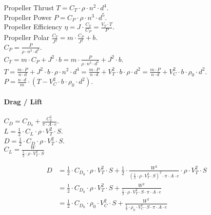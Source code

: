 \documentclass[a4paper,10pt,pdftex]{article}
\begin{document}
Propeller Thrust $T=C_T\cdot\rho\cdot{}n^2\cdot{}d^4$.\\

Propeller Power $P=C_P\cdot\rho\cdot{}n^3\cdot{}d^5$.\\

Propeller Efficiency $\eta=J\cdot\frac{C_T}{C_P}=\frac{V_T\cdot{}T}{P}$.\\

Propeller Polar $\frac{C_T}{J^2}=m\cdot\frac{C_P}{J^2}+b$.\\

$C_P=\frac{P}{\rho\cdot{}n^3\cdot{}d^5}.$\\

$C_T=m\cdot{}C_P+J^2\cdot{}b=m\cdot\frac{P}{\rho\cdot{}n^3\cdot{}d^5}+J^2\cdot{}b$.\\

$T=\frac{m\cdot{}P}{n\cdot{}d}+J^2\cdot{}b\cdot\rho\cdot{}n^2\cdot{}d^4
=\frac{m\cdot{}P}{n\cdot{}d}+V_T^2\cdot{}b\cdot\rho\cdot{}d^2
=\frac{m\cdot{}P}{n\cdot{}d}+V_C^2\cdot{}b\cdot\rho_0\cdot{}d^2$.\\

$P=\frac{n\cdot{}d}{m}\cdot\left(T-V_C^2\cdot{}b\cdot\rho_0\cdot{}d^2\right)$.\\


\paragraph{Drag / Lift}

$C_D = C_{D_0} + \frac{C_L^2}{\pi\cdot{}A\cdot{}e}$.\\

$L=\frac{1}{2}\cdot{}C_L\cdot\rho\cdot{}V_T^2\cdot{}S$. \\

$D=\frac{1}{2}\cdot{}C_D\cdot\rho\cdot{}V_T^2\cdot{}S$. \\

$C_L=\frac{W}{\frac{1}{2}\cdot\rho\cdot{}V_T^2\cdot{}S}$

\begin{equation}
  \begin{split}
    D&=\frac{1}{2}\cdot{}C_{D_0}\cdot\rho\cdot{}V_T^2\cdot{}S
    + \frac{1}{2}\cdot{}\frac{W^2}{(\frac{1}{2}\cdot\rho\cdot{}V_T^2\cdot{}S)^2\cdot\pi\cdot{}A\cdot{}e}\cdot\rho\cdot{}V_T^2\cdot{}S \\
    &=\frac{1}{2}\cdot{}C_{D_0}\cdot\rho\cdot{}V_T^2\cdot{}S
    + \frac{W^2}{\frac{1}{2}\cdot\rho\cdot{}V_T^2\cdot{}S\cdot\pi\cdot{}A\cdot{}e} \\
    &=\frac{1}{2}\cdot{}C_{D_0}\cdot\rho_0\cdot{}V_C^2\cdot{}S
    + \frac{W^2}{\frac{1}{2}\cdot\rho_0\cdot{}V_C^2\cdot{}S\cdot\pi\cdot{}A\cdot{}e}
  \end{split}
\end{equation}
\end{document}
